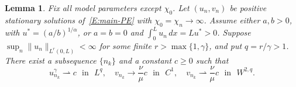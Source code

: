\documentclass[11pt]{article} %
\newtheorem{lemma}{Lemma}[section]
\theoremstyle{remark}
\theoremstyle{remark}
\numberwithin{equation}{section}
\numberwithin{figure}{section}
\numberwithin{table}{section}
\begin{document}
\begin{lemma}\label{L:minimal-spike-limit}
  Fix all model parameters except $\chi_0$. Let $(u_n,v_n)$ be positive
  stationary solutions of~\eqref{E:main-PE} with $\chi_0 = \chi_n \to \infty$.
  Assume either $a, b > 0$, with $u^* = (a/b)^{1/\alpha}$, or $a = b = 0$ and
  $\int_0^L u_n\,dx = Lu^* > 0$. Suppose $\sup_n\|u_n\|_{L^r(0,L)} < \infty$ for
  some finite $r > \max\{1, \gamma\}$, and put $q = r/\gamma > 1$. There exist a
  subsequence $\{n_k\}$ and a constant $c \ge 0$ such that
  \begin{equation}\label{E:minimal-spike-limit-1}
    u_{n_k}^\gamma\rightharpoonup c\,\,\text{ in }\,\, L^q,
    \quad v_{n_k}\to\frac\nu\mu c\,\, \text{ in }\,\, C^1,
    \quad v_{n_k}\rightharpoonup\frac\nu\mu c\,\, \text{ in }\,\, W^{2,q}.
  \end{equation}
\end{lemma}
\end{document}
